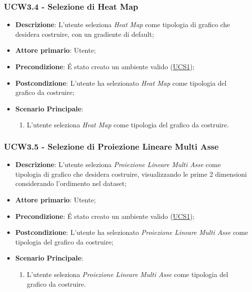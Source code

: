 \subsubsection{UCW3.4 - Selezione di Heat Map}
\label{ssub:ucw3.4}
\begin{itemize}

	\item \textbf{Descrizione}: L’utente seleziona \emph{Heat Map} come tipologia di grafico che desidera
	      costruire, con un gradiente di default;

	\item \textbf{Attore primario}: Utente;

	\item \textbf{Precondizione}:   É stato creato un ambiente valido (\hyperref[sub:ucs1]{UCS1});

	\item \textbf{Postcondizione}:  L'utente ha selezionato \emph{Heat Map} come tipologia del grafico da
	      costruire;

	\item \textbf{Scenario Principale}:
	      \begin{enumerate}
		      \item L'utente seleziona \emph{Heat Map} come tipologia del grafico da costruire.
	      \end{enumerate}

\end{itemize}


\subsubsection{UCW3.5 - Selezione di Proiezione Lineare Multi Asse}
\label{ssub:ucw3.5}
\begin{itemize}

	\item \textbf{Descrizione}: L’utente seleziona \emph{Proiezione Lineare Multi Asse} come tipologia di grafico che
	      desidera costruire, visualizzando le prime 2 dimensioni considerando l'ordimento nel dataset;

	\item \textbf{Attore primario}: Utente;

	\item \textbf{Precondizione}:   É stato creato un ambiente valido (\hyperref[sub:ucs1]{UCS1});

	\item \textbf{Postcondizione}:  L'utente ha selezionato \emph{Proiezione Lineare Multi Asse} come tipologia del
	      grafico da costruire;

	\item \textbf{Scenario Principale}:
	      \begin{enumerate}
		      \item L'utente seleziona \emph{Proiezione Lineare Multi Asse} come tipologia del grafico da costruire.
	      \end{enumerate}
\end{itemize}

